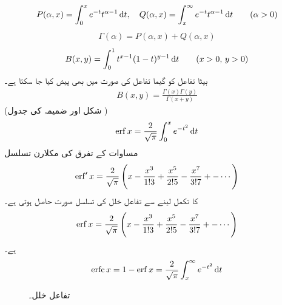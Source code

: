 \begin{align}
P(\alpha,x)=\int_{0}^{x} e^{-t}t^{\alpha-1}\dif t, \quad Q(\alpha,x)=\int_{x}^{\infty} e^{-t}t^{\alpha-1}\dif t \quad \quad (\alpha>0)
\end{align}
%
\begin{align}
\Gamma(\alpha)=P(\alpha,x)+Q(\alpha,x)
\end{align}
\begin{align}
B(x,y)=\int_{0}^{1}t^{x-1}(1-t)^{y-1}\dif t\quad \quad (x>0,\, y>0)
\end{align}
بیٹا تفاعل کو گیما تفاعل کی صورت میں بھی پیش کیا جا سکتا ہے۔
\begin{align}
B(x,y)=\frac{\Gamma(x) \Gamma(y)}{\Gamma(x+y)}
\end{align}
(شکل  اور ضمیمہ  کی جدول )
\begin{align}\label{مساوات_ضمیمہ_تفاعل_خلل_الف}
\erf x=\frac{2}{\sqrt{\pi}}\int_{0}^{x} e^{-t^2}\dif t
\end{align}
مساوات  کے تفرق  کی مکلارن تسلسل 
\begin{align*}
\operatorname{erf}' x=\frac{2}{\sqrt{\pi}}\left(x-\frac{x^3}{1!3}+\frac{x^5}{2!5}-\frac{x^7}{3!7}+-\cdots \right)
\end{align*}
 کا تکمل لینے سے تفاعل خلل کی تسلسل صورت حاصل ہوتی ہے۔
%
\begin{align}
\operatorname{erf} x=\frac{2}{\sqrt{\pi}}\left(x-\frac{x^3}{1!3}+\frac{x^5}{2!5}-\frac{x^7}{3!7}+-\cdots \right)
\end{align}
 ہے۔ 
\begin{align}
\erfc x=1-\erf x=\frac{2}{\sqrt{\pi}} \int_{x}^{\infty} e^{-t^2}\dif t
\end{align}
%
\begin{figure}
\centering
{}
\caption{تفاعل خلل۔}
\label{شکل_ضمیمہ_مفید_تفاعل_خلل}
\end{figure}
